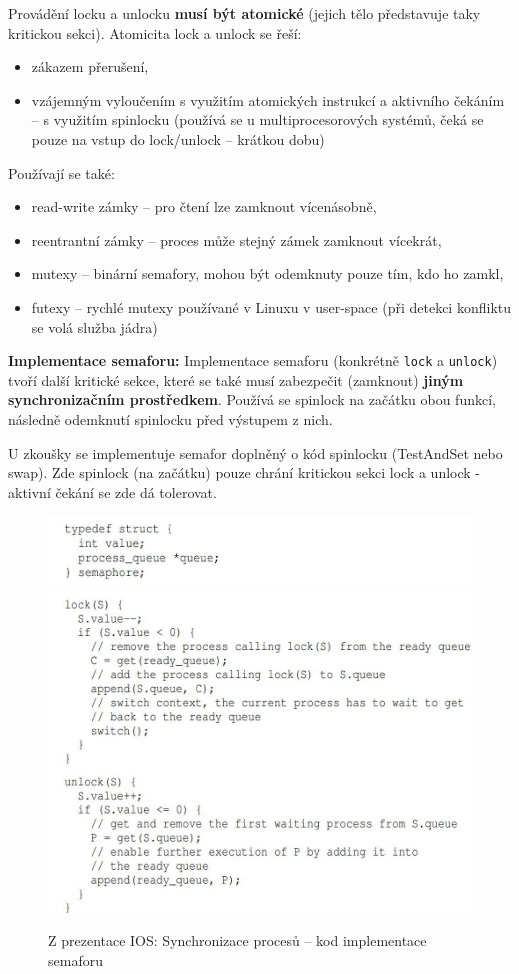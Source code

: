 \documentclass[a4paper, 11pt]{article}
\newcommand{\tcmd}[1]{\texttt{#1}}
\begin{document}
Provádění locku a unlocku \textbf{musí být atomické} (jejich tělo představuje taky kritickou sekci). Atomicita lock a unlock se řeší:
\begin{itemize}
    \item zákazem přerušení,
    \item vzájemným vyloučením s využitím atomických instrukcí a aktivního čekáním -- s využitím spinlocku (používá se u multiprocesorových systémů, čeká se pouze na vstup do lock/unlock -- krátkou dobu)
\end{itemize}
 
Používají se také:
\begin{itemize}
    \item read-write zámky -- pro čtení lze zamknout vícenásobně,
    \item reentrantní zámky -- proces může stejný zámek zamknout vícekrát,
    \item mutexy -- binární semafory, mohou být odemknuty pouze tím, kdo ho zamkl,
    \item futexy -- rychlé mutexy používané v Linuxu v user-space (při detekci konfliktu se volá služba jádra)
\end{itemize}
 
\textbf{Implementace semaforu:}
Implementace semaforu (konkrétně \tcmd{lock} a \tcmd{unlock}) tvoří další kritické sekce, které se také musí zabezpečit (zamknout) \textbf{jiným synchronizačním prostředkem}. Používá se spinlock na začátku obou funkcí, následně odemknutí spinlocku před výstupem z nich.
 
U zkoušky se implementuje semafor doplněný o kód spinlocku (TestAndSet nebo swap). Zde spinlock (na začátku) pouze chrání kritickou sekci lock a unlock - aktivní čekání se zde dá tolerovat.

\begin{figure} [ht]
    \centering
    \includegraphics[scale=2]{10.6_1.jpg}
    \includegraphics[scale=2]{10.6_2.jpg}
    \caption{Z prezentace IOS: Synchronizace procesů -- kod implementace semaforu}
\end{figure}
\end{document}
